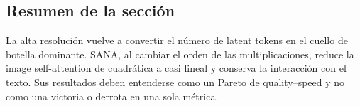 \subsection{Resumen de la sección}

La alta resolución vuelve a convertir el número de latent tokens en el cuello de botella dominante. SANA, al cambiar el orden de las multiplicaciones, reduce la image self-attention de cuadrática a casi lineal y conserva la interacción con el texto. Sus resultados deben entenderse como un Pareto de quality--speed y no como una victoria o derrota en una sola métrica.

